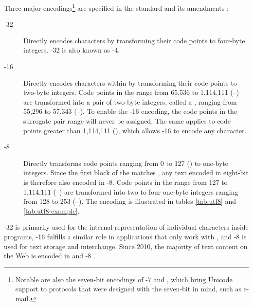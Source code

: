\documentclass[
  a5paper,10pt,           %
  dvipsnames              %
]{book}
\begin{document}
Three major encodings\footnote{
  Notable are also the seven-bit encodings of -7
   and , which bring
  Unicode support to protocols that were designed with the seven-bit
   in mind, such as e-mail.}
are specified in the  standard and its amendments
\cite{iso93:am1,iso93:am2}:
\begin{description}
  \item[-32]Directly
    encodes  characters by transforming their code points to
    four-byte integers. -32 is also known as
    -4.
  \item[-16]
    Directly encodes characters within  by transforming their code
    points to two-byte integers. Code points in the range from 65,536 to
    1,114,111 (\mbox{--}) are transformed into a pair
    of two-byte integers, called a , ranging from
    55,296 to 57,343 (\mbox{--}). To enable the
    -16 encoding, the code points in the surrogate pair range
    will never be assigned. The same applies to code points greater than
    1,114,111 (), which allows -16 to encode any
     character.
  \item[-8]
    Directly transforms code points ranging from 0 to 127 () to one-byte
    integers. Since the first  block of the 
    matches , any text encoded in eight-bit  is
    therefore also encoded in -8. Code points in the range from
    127 to 1,114,111 (\mbox{--}) are transformed into
    two to four one-byte integers ranging from 128 to 253
    (\mbox{--}). The encoding is illustrated in tables
    \ref{tab:utf8} and \ref{tab:utf8-example}.
\end{description}
-32 is primarily used for the internal representation of
individual  characters inside programs, -16 fulfills
a similar role in applications that only work with , and
-8 is used for text storage and interchange. Since 2010, the
majority of text content on the Web is encoded in  and
-8 \cite{qsuccess15}.
\end{document}
